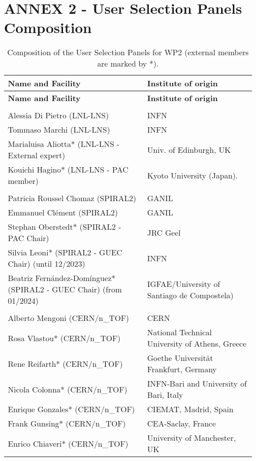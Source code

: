 %

\section{ANNEX 2 - User Selection Panels Composition} 



\begin{longtable}{|L{0.48\textwidth}|C{0.48\textwidth}|}
\caption{Composition of the User Selection Panels for WP2 (external members are marked by *).}
\label{tab:usp-wp2}
    \\ \hline
    {\bf Name and Facility} & {\bf Institute of origin} \\ \hline
    \endfirsthead
    \hline
    {\bf Name and Facility} & {\bf Institute of origin} \\ \hline
    \endhead
    \hline
    \endfoot

      \\ \hline
    Alessia Di Pietro (LNL-LNS)	& INFN \\ \hline
    Tommaso Marchi (LNL-LNS)	 & INFN \\ \hline
    Marialuisa Aliotta* (LNL-LNS - External expert) &	Univ. of Edinburgh, UK \\ \hline
    Kouichi Hagino*  (LNL-LNS - PAC member)	& Kyoto University (Japan). \\ \hline
    
      \\ \hline
    Patricia Roussel Chomaz  (SPIRAL2)	& GANIL \\ \hline
    Emmanuel Clément (SPIRAL2)	& GANIL \\ \hline
    Stephan Oberstedt* (SPIRAL2 - PAC Chair) &	JRC Geel \\ \hline
    Silvia Leoni* (SPIRAL2 - GUEC Chair) (until 12/2023)	& INFN \\ \hline
   Beatriz Fernández-Domínguez* (SPIRAL2 - GUEC Chair) (from 01/2024)	& 
IGFAE/University of Santiago de Compostela)  \\ \hline
        
      \\ \hline
    Alberto Mengoni (CERN/n\_TOF)	& CERN \\ \hline
    Rosa Vlastou* (CERN/n\_TOF)	& National Technical University of Athens, Greece \\ \hline
    Rene Reifarth* (CERN/n\_TOF)	& Goethe Universität Frankfurt, Germany \\ \hline
    Nicola Colonna* (CERN/n\_TOF)	& INFN-Bari and University of Bari, Italy \\ \hline
    Enrique Gonzales* (CERN/n\_TOF)	& CIEMAT, Madrid, Spain \\ \hline
    Frank Gunsing* (CERN/n\_TOF)	& CEA-Saclay, France \\ \hline
    Enrico Chiaveri* (CERN/n\_TOF)	& University of Manchester, UK \\ \hline
    

\end{longtable}
